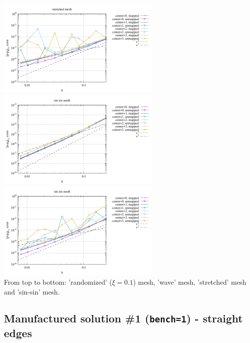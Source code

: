 \begin{center}
\includegraphics[width=8cm]{python_codes/fieldstone_76/results/bench3/curved/errors_P_mt4.pdf}\\
\includegraphics[width=8cm]{python_codes/fieldstone_76/results/bench3/curved/errors_V_mt5.pdf}
\includegraphics[width=8cm]{python_codes/fieldstone_76/results/bench3/curved/errors_P_mt5.pdf}\\
{\captionfont From top to bottom: 'randomized' ($\xi=0.1$) mesh,
'wave' mesh, 'stretched' mesh and 'sin-sin' mesh.}
\end{center}

\newpage
\subsection*{Manufactured solution \#1 ({\tt bench=1}) - straight edges}

